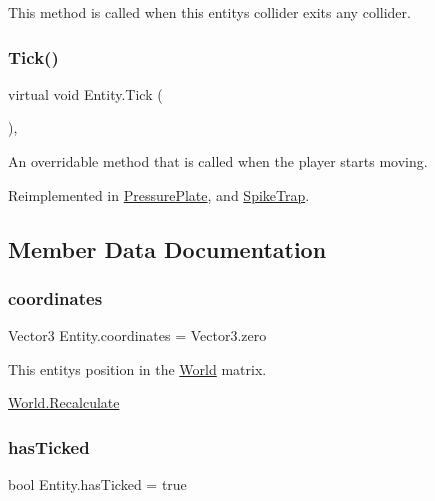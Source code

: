 This method is called when this entity\textquotesingle{}s collider exits any collider. \mbox{\label{class_entity_a7a09da64c6d87cd1bce0bb69512d82fc}} 
\subsubsection{\texorpdfstring{Tick()}{Tick()}}
{\footnotesize\ttfamily virtual void Entity.\+Tick (\begin{DoxyParamCaption}{ }\end{DoxyParamCaption})\hspace{0.3cm}{\ttfamily [inline]}, {\ttfamily [virtual]}}



An overridable method that is called when the player starts moving. 



Reimplemented in \mbox{\hyperlink{class_pressure_plate_a38ab73177e6bef277e62247d7f5fe2f8}{Pressure\+Plate}}, and \mbox{\hyperlink{class_spike_trap_ae5f99ac571f8c550780bae8eacef23c0}{Spike\+Trap}}.



\subsection{Member Data Documentation}
\mbox{\label{class_entity_af07da28c7ac110de4e22283ffb86380a}} 
\subsubsection{\texorpdfstring{coordinates}{coordinates}}
{\footnotesize\ttfamily Vector3 Entity.\+coordinates = Vector3.\+zero}



This entity\textquotesingle{}s position in the \mbox{\hyperlink{class_world}{World}} matrix. 

\mbox{\hyperlink{class_world_aafe2420b96ed8e71db9837b1517d093c}{World.\+Recalculate}} \mbox{\label{class_entity_a5c863af2a4933e264e30be69644c749e}} 
\subsubsection{\texorpdfstring{has\+Ticked}{hasTicked}}
{\footnotesize\ttfamily bool Entity.\+has\+Ticked = true}




